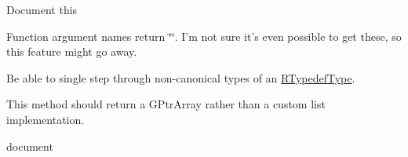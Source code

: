 
\begin{DoxyRefList}
\item[\label{todo__todo000007}%
\hypertarget{todo__todo000007}{}%
Member \hyperlink{type_8h_a98af7901cdefcac1a911764c15d636f0}{r\-\_\-type\-\_\-size} (\hyperlink{struct_r_type}{R\-Type} $\ast$, G\-Error $\ast$$\ast$error)]Document this  
\item[\label{todo__todo000001}%
\hypertarget{todo__todo000001}{}%
Member \hyperlink{struct_r_aggregate_member_a48fc0de0e9dc5bfba78304194536c919}{R\-Aggregate\-Member\-:\-:r\-\_\-aggregate\-\_\-member\-\_\-name} (\hyperlink{struct_r_aggregate_member}{R\-Aggregate\-Member} $\ast$member, G\-Error $\ast$$\ast$error)]Function argument names return {\ttfamily \char`\"{}\char`\"{}}. I'm not sure it's even possible to get these, so this feature might go away.  
\item[\label{todo__todo000008}%
\hypertarget{todo__todo000008}{}%
Member \hyperlink{struct_r_typedef_type_afa3538fc4df5050ba3df60547f36536c}{R\-Typedef\-Type\-:\-:r\-\_\-typedef\-\_\-type\-\_\-canonical} (\hyperlink{struct_r_typedef_type}{R\-Typedef\-Type} $\ast$, G\-Error $\ast$$\ast$error)]Be able to single step through non-\/canonical types of an \hyperlink{struct_r_typedef_type}{R\-Typedef\-Type}.  
\item[\label{todo__todo000002}%
\hypertarget{todo__todo000002}{}%
Member \hyperlink{ruminate_2ruminate_8h_ace611a174dd203875ab2ea450ed0080b}{ruminate\-\_\-backtrace} (G\-Error $\ast$$\ast$error)]This method should return a G\-Ptr\-Array rather than a custom list implementation.  
\item[\label{todo__todo000003}%
\hypertarget{todo__todo000003}{}%
Member \hyperlink{ruminate_2ruminate_8h_aeb372297a5feab4cb66e051256fd3a22}{ruminate\-\_\-get\-\_\-type\-\_\-by\-\_\-variable\-\_\-name} (const char $\ast$, G\-Error $\ast$$\ast$)]document 
\end{DoxyRefList}